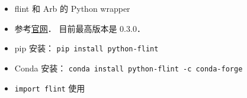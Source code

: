 
\begin{issues}
\issueDraft
\end{issues}

\begin{itemize}
\item flint 和 Arb 的 Python wrapper
\item 参考\href{https://fredrikj.net/python-flint/}{官网}． 目前最高版本是 0.3.0．
\item pip 安装： \verb|pip install python-flint|
\item Conda 安装： \verb|conda install python-flint -c conda-forge|
\item \verb|import flint| 使用
\end{itemize}
